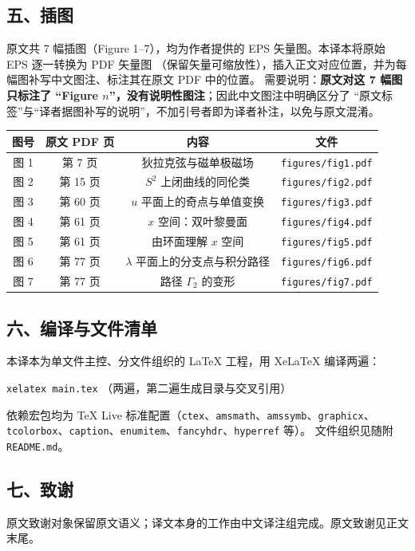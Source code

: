 \subsection*{五、插图}

原文共 7 幅插图（Figure 1--7），均为作者提供的 EPS 矢量图。本译本将原始 EPS 逐一转换为 PDF 矢量图
（保留矢量可缩放性），插入正文对应位置，并为每幅图补写中文图注、标注其在原文 PDF 中的位置。
需要说明：\textbf{原文对这 7 幅图只标注了 “Figure $n$”，没有说明性图注}；因此中文图注中明确区分了
“原文标签”与“译者据图补写的说明”，不加引号者即为译者补注，以免与原文混淆。

\begin{center}
\small
\begin{tabular}{@{}cccc@{}}
\toprule
图号 & 原文 PDF 页 & 内容 & 文件 \\
\midrule
图 1 & 第 7 页  & 狄拉克弦与磁单极磁场 & \texttt{figures/fig1.pdf} \\
图 2 & 第 15 页 & $S^2$ 上闭曲线的同伦类 & \texttt{figures/fig2.pdf} \\
图 3 & 第 60 页 & $u$ 平面上的奇点与单值变换 & \texttt{figures/fig3.pdf} \\
图 4 & 第 61 页 & $x$ 空间：双叶黎曼面 & \texttt{figures/fig4.pdf} \\
图 5 & 第 61 页 & 由环面理解 $x$ 空间 & \texttt{figures/fig5.pdf} \\
图 6 & 第 77 页 & $\lambda$ 平面上的分支点与积分路径 & \texttt{figures/fig6.pdf} \\
图 7 & 第 77 页 & 路径 $\Gamma_2$ 的变形 & \texttt{figures/fig7.pdf} \\
\bottomrule
\end{tabular}
\end{center}

\subsection*{六、编译与文件清单}

本译本为单文件主控、分文件组织的 LaTeX 工程，用 XeLaTeX 编译两遍：
\begin{center}
\verb|xelatex main.tex| \quad（两遍，第二遍生成目录与交叉引用）
\end{center}
依赖宏包均为 TeX Live 标准配置（\texttt{ctex}、\texttt{amsmath}、\texttt{amssymb}、\texttt{graphicx}、
\texttt{tcolorbox}、\texttt{caption}、\texttt{enumitem}、\texttt{fancyhdr}、\texttt{hyperref} 等）。
文件组织见随附 \texttt{README.md}。

\subsection*{七、致谢}

原文致谢对象保留原文语义；译文本身的工作由中文译注组完成。原文致谢见正文末尾。

\newpage
